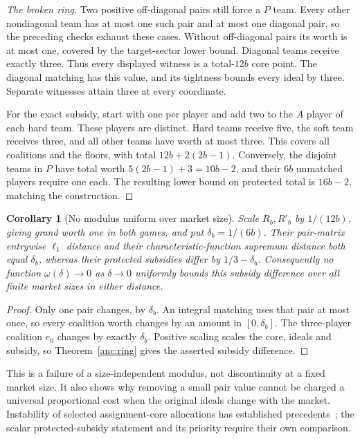 \documentclass[11pt]{article}
\newtheorem{corollary}[theorem]{Corollary}
\theoremstyle{remark}
\begin{document}
\begin{proof}[The broken ring]
Two positive off-diagonal pairs still force a $P$ team. Every other
nondiagonal team has at most one such pair and at most one diagonal
pair, so the preceding checks exhaust these cases. Without off-diagonal
pairs its worth is at most one, covered by the target-sector lower
bound. Diagonal teams receive exactly three. Thus every displayed
witness is a total-$12b$ core point. The diagonal matching has this
value, and its tightness bounds every ideal by three. Separate witnesses
attain three at every coordinate.

For the exact subsidy, start with one per player and add two to the
$A$ player of each hard team. These players are distinct. Hard teams
receive five, the soft team receives three, and all other teams have
worth at most three. This covers all coalitions and the floors, with
total $12b+2(2b-1)$. Conversely, the disjoint teams in $P$ have total
worth $5(2b-1)+3=10b-2$, and their $6b$ unmatched players require one
each. The resulting lower bound on protected total is $16b-2$, matching
the construction.
\end{proof}

\begin{corollary}[No modulus uniform over market size]\label{anc:modulus}
Scale $R_b,R'_b$ by $1/(12b)$, giving grand worth one in both games,
and put $\delta_b=1/(6b)$. Their pair-matrix entrywise $\ell_1$
distance and their characteristic-function supremum distance both equal
$\delta_b$, whereas their protected subsidies differ by
$1/3-\delta_b$. Consequently no function $\omega(\delta)\to0$ as
$\delta\to0$ uniformly bounds this subsidy difference over all finite
market sizes in either distance.
\end{corollary}
\begin{proof}
Only one pair changes, by $\delta_b$. An integral matching uses that
pair at most once, so every coalition worth changes by an amount in
$[0,\delta_b]$. The three-player coalition $e_0$ changes by exactly
$\delta_b$. Positive scaling scales the core, ideals and subsidy,
so Theorem~\ref{anc:ring} gives the asserted subsidy difference.
\end{proof}
This is a failure of a size-independent modulus, not discontinuity at a
fixed market size. It also shows why removing a small pair value cannot
be charged a universal proportional cost when the original ideals change
with the market. Instability of selected assignment-core allocations
has established precedents~\cite[Example~3]{anc:KumabeYoshida2024}; the
scalar protected-subsidy statement and its priority require their own
comparison.
\end{document}
